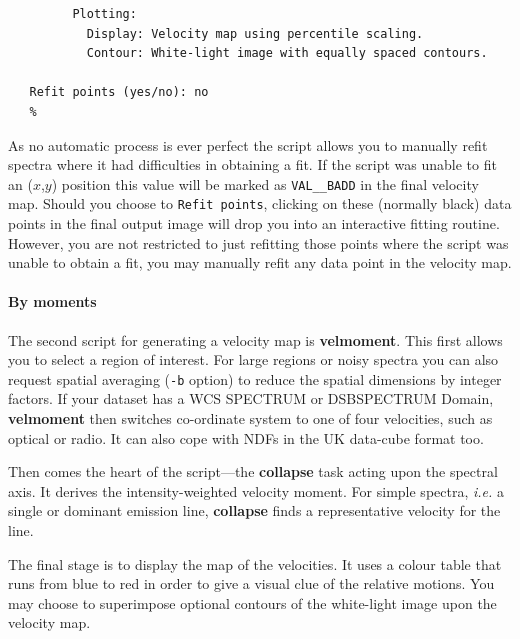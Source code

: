 \documentclass[twoside,11pt]{article}
\newcommand{\htmlref}[2]{#1}
\newcommand{\xref}[3]{#1}
\newcommand{\xlabel}[1]{}
\newcommand{\latex}[1]{#1}
\begin{document}
{\begin{verbatim}
         Plotting:
           Display: Velocity map using percentile scaling.
           Contour: White-light image with equally spaced contours.
 
   Refit points (yes/no): no
   %
\end{verbatim}\normalsize

As no automatic process is ever perfect the script allows you to
manually refit spectra where it had difficulties in obtaining a fit.
If the script was unable to fit an ($x$,$y$) position this value will be
marked as {\tt VAL\_\_BADD} in the final velocity map.  Should you choose
to {\tt Refit points}, clicking on these (normally black) data points in
the final output image will drop you into an interactive fitting
routine.  However, you are not restricted to just refitting those points
where the script was unable to obtain a fit, you may manually refit
any data point in the velocity map.

\paragraph{\label{sc16_velmoment}\latex{\vspace*{0.8em}}By
moments\latex{\newline}\xlabel{sc16_velmoment}}

\hspace*{-2.1ex}The second script for generating a velocity map is \xref{{\bf
velmoment}}{sun237}{velmoment}.  This first allows you to select a
region of interest.  For large regions or noisy spectra you can also
request spatial averaging ({\tt -b} option) to reduce the spatial
dimensions by integer factors.  If your dataset has a WCS
\xref{SPECTRUM or DSBSPECTRUM Domain}{sun95}{se_domains}, {\bf velmoment}
then switches co-ordinate system to one of four velocities, such as
optical or radio.  It can also cope with NDFs in the
\htmlref{UK data-cube format}{sc16_teifufile} too.

Then comes the heart of the script---the 
\xref{{\bf collapse}}{sun95}{COLLAPSE} task acting upon the spectral
axis.  It derives the intensity-weighted velocity moment.  For simple
spectra, \emph{i.e.} a single or dominant emission line, {\bf
collapse} finds a representative velocity for the line.

The final stage is to display the map of the velocities.  It uses a
colour table that runs from blue to red in order to give a visual clue
of the relative motions.  You may choose to superimpose optional
contours of the white-light image upon the velocity map.

}
\end{document}
